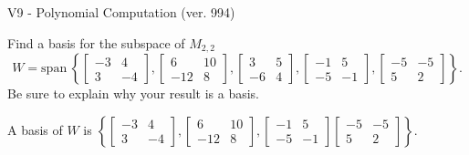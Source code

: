 \begin{exercise}
  \begin{exerciseTitle}V9 - Polynomial Computation (ver. 994)\end{exerciseTitle}
  \begin{exerciseStatement}
    Find a basis for the subspace of \(M_{2,2}\) 
\[W=\mathrm{span}\ \left\{\left[\begin{array}{cc}
-3 & 4 \\
3 & -4
\end{array}\right] , \left[\begin{array}{cc}
6 & 10 \\
-12 & 8
\end{array}\right] , \left[\begin{array}{cc}
3 & 5 \\
-6 & 4
\end{array}\right] , \left[\begin{array}{cc}
-1 & 5 \\
-5 & -1
\end{array}\right] , \left[\begin{array}{cc}
-5 & -5 \\
5 & 2
\end{array}\right]\right\}.\]
 Be sure to explain why your result is a basis.


  \end{exerciseStatement}
  \begin{exerciseAnswer}
   A basis of \(W\) is  \(\left\{\left[\begin{array}{cc}
-3 & 4 \\
3 & -4
\end{array}\right] , \left[\begin{array}{cc}
6 & 10 \\
-12 & 8
\end{array}\right] , \left[\begin{array}{cc}
-1 & 5 \\
-5 & -1
\end{array}\right] \left[\begin{array}{cc}
-5 & -5 \\
5 & 2
\end{array}\right]\right\}\).
  


  \end{exerciseAnswer}
\end{exercise}